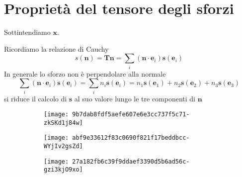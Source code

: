 \documentclass[10pt,a4paper,twoside]{book}
\begin{document}
\section{Proprietà del tensore degli sforzi}

Sottintendiamo $\mathbf{x}$.

Ricordiamo la relazione di Cauchy
\begin{equation*}
s(\mathbf{n}) =\mathbf{Tn} =\sum _{i}(\mathbf{n} \cdotp \mathbf{e}_{i})\mathbf{s}(\mathbf{e}_{i})
\end{equation*}
In generale lo sforzo non è perpendolare alla normale
\begin{equation*}
\sum _{i}(\mathbf{n} \cdotp \mathbf{e}_{i})\mathbf{s}(\mathbf{e}_{i}) =\sum _{i} n_{i}\mathbf{s}(\mathbf{e}_{i}) =n_{1}\mathbf{s}(\mathbf{e}_{1}) +n_{2}\mathbf{s}(\mathbf{e}_{2}) +n_{3}\mathbf{s}(\mathbf{e}_{3})
\end{equation*}
si riduce il calcolo di $\mathbf{s}$ al suo valore lungo le tre componenti di $\mathbf{n}$


\begin{figure}[htpb]
     \centering
     \begin{subfigure}[b]{0.3\textwidth}
         \centering
         \texttt{[image: 9b7dab8fdf5aefe607e6e3cc737f5c71-zkSKd1j84w]}
     \end{subfigure}
     \hfill
     \begin{subfigure}[b]{0.3\textwidth}
         \centering
         \texttt{[image: abf9e33612f83c0690f821f17beddbcc-WYjIv2gsZd]}
     \end{subfigure}
     \hfill
     \begin{subfigure}[b]{0.3\textwidth}
         \centering
         \texttt{[image: 27a182fb6c39f9ddaef3390d5b6ad56c-gzi3kjO9xo]}
     \end{subfigure}
\end{figure}
\FloatBarrier
\end{document}
